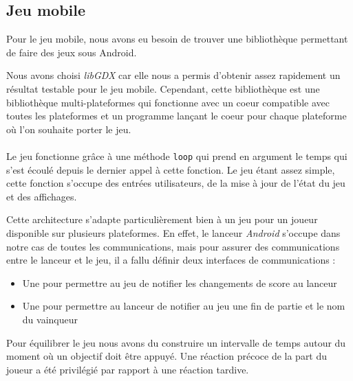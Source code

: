 \subsection{Jeu mobile}
Pour le jeu mobile, nous avons eu besoin de trouver une bibliothèque permettant de faire des jeux sous Android.

Nous avons choisi \textit{libGDX} car elle nous a permis d'obtenir assez rapidement un résultat testable pour le jeu mobile. Cependant, cette bibliothèque est une bibliothèque multi-plateformes qui fonctionne avec un coeur compatible avec toutes les plateformes et un programme lançant le coeur pour chaque plateforme où l'on souhaite porter le jeu.

\paragraph{}
Le jeu fonctionne grâce à une méthode \verb!loop! qui prend en argument le temps qui s'est écoulé depuis le dernier appel à cette fonction. Le jeu étant assez simple, cette fonction s'occupe des entrées utilisateurs, de la mise à jour de l'état du jeu et des affichages.

Cette architecture s'adapte particulièrement bien à un jeu pour un joueur disponible sur plusieurs plateformes. En effet, le lanceur \textit{Android} s'occupe dans notre cas de toutes les communications, mais pour assurer des communications entre le lanceur et le jeu, il a fallu définir deux interfaces de communications :
\begin{itemize}
\item Une pour permettre au jeu de notifier les changements de score au lanceur
\item Une pour permettre au lanceur de notifier au jeu une fin de partie et le nom du vainqueur
\end{itemize}

Pour équilibrer le jeu nous avons du construire un intervalle de temps autour du moment où un objectif doit être appuyé. Une réaction précoce de la part du joueur a été privilégié par rapport à une réaction tardive.
